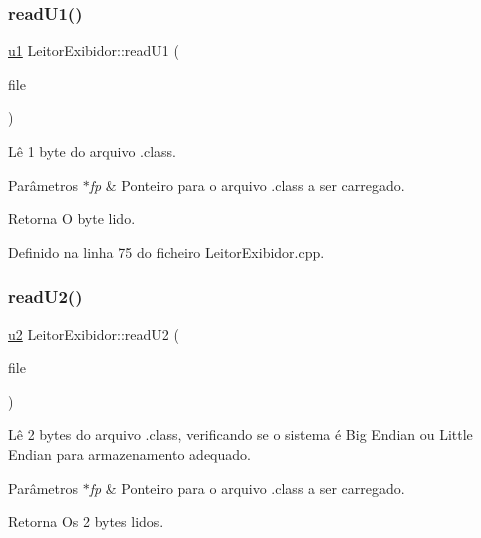 \subsubsection{\texorpdfstring{read\+U1()}{readU1()}}
{\footnotesize\ttfamily \hyperlink{BasicTypes_8h_ad9f4cdb6757615aae2fad89dab3c5470}{u1} Leitor\+Exibidor\+::read\+U1 (\begin{DoxyParamCaption}\item[{F\+I\+LE $\ast$}]{file }\end{DoxyParamCaption})\hspace{0.3cm}{\ttfamily [private]}}

Lê 1 byte do arquivo .class. 
\begin{DoxyParams}{Parâmetros}
{\em $\ast$fp} & Ponteiro para o arquivo .class a ser carregado. \\
\hline
\end{DoxyParams}
\begin{DoxyReturn}{Retorna}
O byte lido. 
\end{DoxyReturn}


Definido na linha 75 do ficheiro Leitor\+Exibidor.\+cpp.

\mbox{\label{classLeitorExibidor_aa801d28856915543cfd59fb787e59626}} 
\subsubsection{\texorpdfstring{read\+U2()}{readU2()}}
{\footnotesize\ttfamily \hyperlink{BasicTypes_8h_a732cde1300aafb73b0ea6c2558a7a54f}{u2} Leitor\+Exibidor\+::read\+U2 (\begin{DoxyParamCaption}\item[{F\+I\+LE $\ast$}]{file }\end{DoxyParamCaption})\hspace{0.3cm}{\ttfamily [private]}}

Lê 2 bytes do arquivo .class, verificando se o sistema é Big Endian ou Little Endian para armazenamento adequado. 
\begin{DoxyParams}{Parâmetros}
{\em $\ast$fp} & Ponteiro para o arquivo .class a ser carregado. \\
\hline
\end{DoxyParams}
\begin{DoxyReturn}{Retorna}
Os 2 bytes lidos. 
\end{DoxyReturn}


